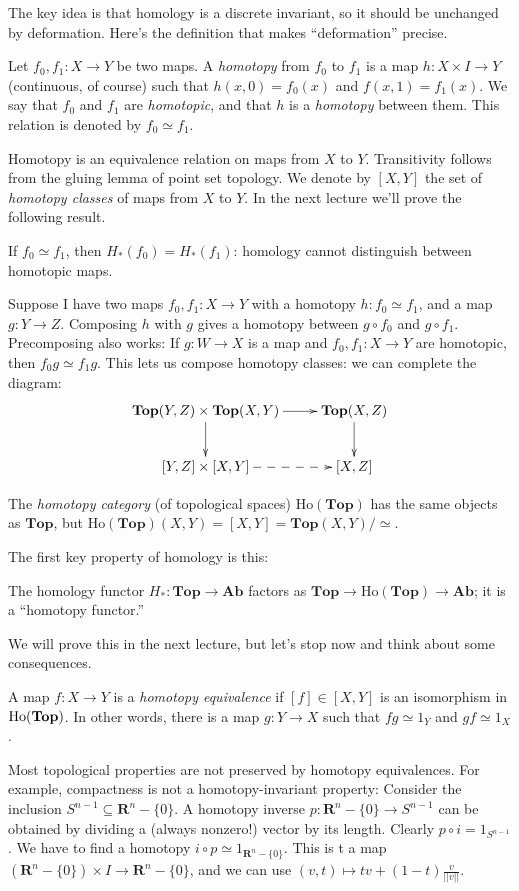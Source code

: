 The key idea is that homology is a discrete invariant, so it should be 
unchanged by deformation. Here's the definition that makes ``deformation''
precise.
\begin{definition}
Let $f_0,f_1:X\to Y$ be two maps. A {\em homotopy} from $f_0$ to $f_1$ is a map $h:X\times I\to Y$ (continuous, of course) such that $h(x,0)=f_0(x)$ and $f(x,1)=f_1(x)$. We say that $f_0$ and $f_1$ are {\em homotopic}, and that $h$ is a {\em homotopy} between them. This relation is denoted by $f_0\simeq f_1$. 
\end{definition}
Homotopy is an equivalence relation on maps from $X$ to $Y$.
Transitivity follows from the gluing lemma of point set topology.
We denote by $[X,Y]$ the set of {\em homotopy classes} of maps from $X$ to $Y$.
In the next lecture we'll prove the following result.
\begin{theorem}
If $f_0\simeq f_1$, then $ H_\ast(f_0)= H_\ast(f_1)$: homology cannot distinguish between homotopic maps.
\end{theorem}
Suppose I have two maps $f_0,f_1:X\to Y$ with a homotopy $h:f_0\simeq f_1$, and a map $g:Y\to Z$. Composing $h$ with $g$ gives a homotopy between $g\circ f_0$ and $g\circ f_1$. Precomposing also works: If $g:W\to X$ is a map and $f_0,f_1:X\to Y$ are homotopic, then $f_0g\simeq f_1g$. This lets us compose homotopy classes: we can complete the diagram:
\begin{equation*}
\xymatrix{\mathbf{Top}(Y,Z)\times\mathbf{Top}(X,Y)\ar[d]\ar[r] & \mathbf{Top}(X,Z)\ar[d]\\
[Y,Z]\times[X,Y]\ar@{-->}[r] & [X,Z]}
\end{equation*}
\begin{definition}
The {\em homotopy category} (of topological spaces) 
$\mathrm{Ho}(\mathbf{Top})$ has the same objects as $\mathbf{Top}$, but
$\mathrm{Ho}(\mathbf{Top})(X,Y)=[X,Y]=\mathbf{Top}(X,Y)/\simeq$.
\end{definition}
The first key property of homology is this:
\begin{theorem}
The homology functor $ H_\ast:\mathbf{Top}\to\mathbf{Ab}$ factors as $\mathbf{Top}\to\mathrm{Ho}(\mathbf{Top})\to\mathbf{Ab}$; it is a ``homotopy functor.''
\end{theorem}
We will prove this in the next lecture, but let's stop now and think about some
consequences. 
\begin{definition}
A map $f:X\to Y$ is a {\em homotopy equivalence} if $[f]\in[X,Y]$ is an isomorphism in $\mathrm{Ho}(\mathbf{Top})$. In other words, there is a map $g:Y\to X$ such that $fg\simeq 1_Y$ and $gf\simeq1_X$.
\end{definition}
Most topological properties are not preserved by homotopy equivalences.
For example, compactness is not a homotopy-invariant property: Consider the inclusion $S^{n-1}\subseteq \mathbf{R}^n-\{0\}$. A homotopy inverse $p:\mathbf{R}^n-\{0\}\to S^{n-1}$ can be obtained by dividing a (always nonzero!) vector by its length. Clearly $p\circ i=1_{S^{n-1}}$. We have to find a homotopy $i\circ p\simeq1_{\mathbf{R}^n-\{0\}}$. This is t a map $(\mathbf{R}^n-\{0\})\times I\to \mathbf{R}^n-\{0\}$, and we can use $(v,t)\mapsto tv+(1-t)\frac{v}{||v||}$.

